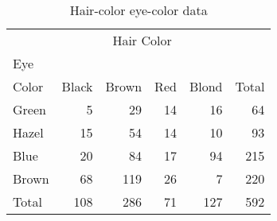\begin{table}[htb]

\caption{Hair-color eye-color data}\label{tab:hairdat}
\begin{center}
\begin{tabular}{l|rrrr|r}
\hline
        & \multicolumn{4}{c|}{Hair Color}        & \\
Eye     &         &         &         &         &       \\
Color   &  Black  &  Brown  &    Red  &  Blond  & Total \\[2ex] \hline
Green   &      5  &     29  &     14  &     16  &    64 \\
Hazel   &     15  &     54  &     14  &     10  &    93 \\
Blue    &     20  &     84  &     17  &     94  &   215 \\
Brown   &     68  &    119  &     26  &      7  &   220 \\[1ex] \hline
Total   &    108  &    286  &     71  &    127  &   592 \\ \hline
\end{tabular}
\end{center}
\end{table}

